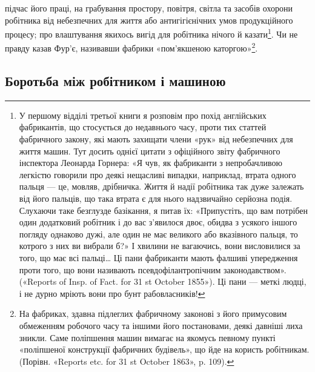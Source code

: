 підчас його праці, на грабування простору, повітря, світла
та засобів охорони робітника від небезпечних для життя або антигігієнічних
умов продукційного процесу; про влаштування якихось
вигід для робітника нічого й казати\footnote{
У першому відділі третьої книги я розповім про похід англійських
фабрикантів, що стосується до недавнього часу, проти тих статтей фабричного
закону, які мають захищати члени «рук» від небезпечних для життя
машин. Тут досить однієї цитати з офіційного звіту фабричного інспектора
Леонарда Горнера: «Я чув, як фабриканти з непробачливою легкістю
говорили про деякі нещасливі випадки, наприклад, втрата одного пальця —
це, мовляв, дрібничка. Життя й надії робітника так дуже залежать від
його пальців, що така втрата є для нього надзвичайно серйозна подія.
Слухаючи таке безглузде базікання, я питав їх: «Припустіть, що вам потрібен
один додатковий робітник і до вас з’явилося двоє, обидва з усякого
іншого погляду однаково дужі, але один не має великого або вказівного
пальця, то котрого з них ви вибрали б?» І хвилини не вагаючись, вони
висловилися за того, що має всі пальці\dots{} Ці пани фабриканти мають
фалшиві упередження проти того, що вони називають псевдофілантропічним
законодавством». («Reports of Insp. of Fact. for 31 st October
1855»). Ці пани — меткі людці, і не дурно мріють вони про бунт рабовласників!
}. Чи не правду казав Фур’є, називавши фабрики «пом’якшеною каторгою»\footnote{
На фабриках, здавна підлеглих фабричному законові з його примусовим
обмеженням робочого часу та іншими його постановами, деякі
давніші лиха зникли. Саме поліпшення машин вимагає на якомусь певному
пункті «поліпшеної конструкції фабричних будівель», що йде на
користь робітникам. (Порівн. «Reports etc. for 31 st October 1863», p. 109).
}.

\subsection{Боротьба між робітником і машиною}

